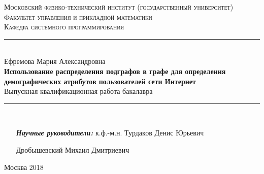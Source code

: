 \begin{titlepage}
\thispagestyle{empty}
\newcommand{\HRule}{\rule{\linewidth}{0.5mm}}
\hspace{1cm}
\center

\textsc{\large Московский физико-технический институт \linebreak (государственный университет)}\\[1.5cm]
\textsc{ Факультет управления и прикладной математики}\\[0.8cm]
\MSonehalfspacing
\textsc{ Кафедра системного программирования}\\[1.0cm]

\HRule\\[1.4cm]
\MSdoublespacing
{\large Ефремова Мария Александровна}\\[0.5cm]
{ \huge \bfseries Использование распределения подграфов в графе для определения демографических атрибутов пользователей сети Интернет}\\[0.2cm]
{\large Выпускная квалификационная работа бакалавра}

\HRule \\[2.4cm]
\MSonehalfspacing

\begin{minipage}[t]{0.5\textwidth}
	\begin{itemize}
	\item[\emph{\bfseries Научные руководители:}] к.ф.-м.н. Турдаков Денис Юрьевич
	\item[\emph{}] Дробышевский Михаил Дмитриевич
	\end{itemize}
\end{minipage}

\vspace{2.9cm}

\flushright \emph{} Москва 2018
\end{titlepage}
\restoregeometry

\tableofcontents
{}
\thispagestyle{empty}

\MSonehalfspacing
\newpage
\setcounter{page}{1}
\pagestyle{fancy}